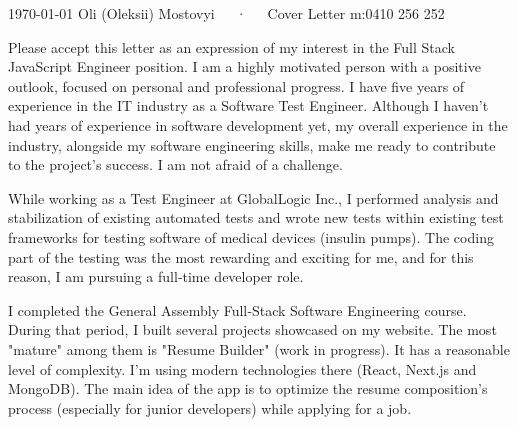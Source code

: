 \documentclass[10pt, a4paper]{awesome-cv}
\begin{document}
\makecvheader[R]

\makecvfooter
  {\today}
  {Oli (Oleksii) Mostovyi~~~·~~~Cover Letter}
  {m:0410 256 252}

\makelettertitle

\begin{cvletter}
Please accept this letter as an expression of my interest in the Full Stack JavaScript Engineer position.
I am a highly motivated person with a positive outlook, focused on personal and professional progress. I have five years of experience in the IT industry as a Software Test Engineer. Although I haven't had years of experience in software development yet, my overall experience in the industry, alongside my software engineering skills, make me ready to contribute to the project's success. I am not afraid of a challenge. 

While working as a Test Engineer at GlobalLogic Inc., I performed analysis and stabilization of existing automated tests and wrote new tests within existing test frameworks for testing software of medical devices (insulin pumps). The coding part of the testing was the most rewarding and exciting for me, and for this reason, I am pursuing a full‐time developer role. 

I completed the General Assembly Full‐Stack Software Engineering course. During that period, I built several projects showcased on my website. The most "mature" among them is "Resume Builder" (work in progress). It has a reasonable level of complexity. I'm using modern technologies there (React, Next.js and MongoDB). The main idea of the app is to optimize the resume composition's process (especially for junior developers) while applying for a job. 


\end{cvletter}
\end{document}
